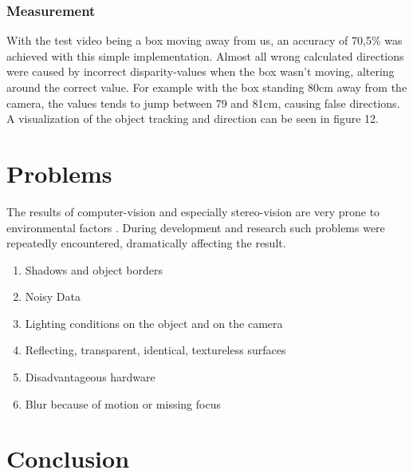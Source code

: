 \documentclass[journal,onecolumn]{IEEEtran}
\begin{document}
\subsubsection{Measurement}
\noindent With the test video being a box moving away from us, an accuracy of 70,5\% was achieved with this simple implementation. Almost all wrong calculated directions were caused by incorrect disparity-values when the box wasn't moving, altering around the correct value. For example with the box standing 80cm away from the camera, the values tends to jump between 79 and 81cm, causing false directions. A visualization of the object tracking and direction can be seen in figure 12.


\section{Problems}
\noindent The results of computer-vision and especially stereo-vision are very prone to environmental factors\cite{problemsStereo} \cite{gennert1987computational}. During development and research such problems were repeatedly encountered, dramatically affecting the result.
\begin{enumerate}
	\item Shadows and object borders
	\item Noisy Data
	\item Lighting conditions on the object and on the camera
	\item Reflecting, transparent, identical, textureless surfaces
	\item Disadvantageous hardware
	\item Blur because of motion or missing focus
\end{enumerate}


\section{Conclusion}
\end{document}
